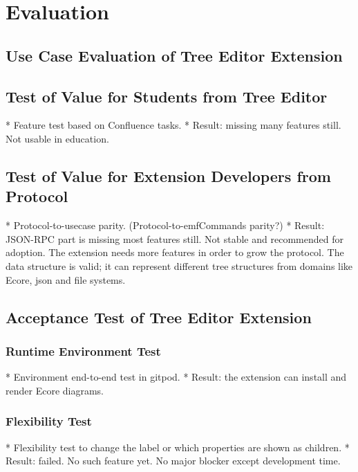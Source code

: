 \chapter{Evaluation}\label{chap:evaluation}

\section{Use Case Evaluation of Tree Editor Extension}




\section{Test of Value for Students from Tree Editor}

* Feature test based on Confluence tasks.
  * Result: missing many features still. Not usable in education.

\section{Test of Value for Extension Developers from Protocol}
* Protocol-to-usecase parity. (Protocol-to-emfCommands parity?)
  * Result: JSON-RPC part is missing most features still. Not stable and recommended for adoption. The extension needs more features in order to grow the protocol. The data structure is valid; it can represent different tree structures from domains like Ecore, json and file systems.

\section{Acceptance Test of Tree Editor Extension}

\subsection{Runtime Environment Test}
* Environment end-to-end test in gitpod.
  * Result: the extension can install and render Ecore diagrams.

\subsection{Flexibility Test}
* Flexibility test to change the label or which properties are shown as children.
  * Result: failed. No such feature yet. No major blocker except development time.

